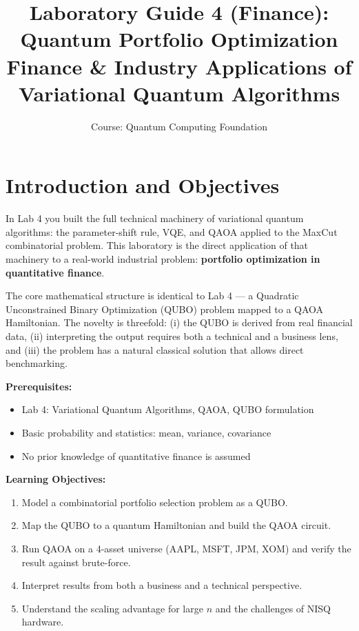 \documentclass[a4paper,11pt]{article}
\title{\textbf{Laboratory Guide 4 (Finance): Quantum Portfolio Optimization}\\
\large Finance \& Industry Applications of Variational Quantum Algorithms}
\author{Course: Quantum Computing Foundation}
\date{}
\begin{document}
\maketitle
\tableofcontents
\newpage

\section{Introduction and Objectives}

In Lab 4 you built the full technical machinery of variational quantum
algorithms: the parameter-shift rule, VQE, and QAOA applied to the MaxCut
combinatorial problem. This laboratory is the direct application of that
machinery to a real-world industrial problem: \textbf{portfolio optimization
in quantitative finance}.

The core mathematical structure is identical to Lab 4 — a Quadratic
Unconstrained Binary Optimization (QUBO) problem mapped to a QAOA Hamiltonian.
The novelty is threefold: (i) the QUBO is derived from real financial data,
(ii) interpreting the output requires both a technical and a business lens,
and (iii) the problem has a natural classical solution that allows direct
benchmarking.

\vspace{0.3cm}
\noindent\textbf{Prerequisites:}
\begin{itemize}
    \item Lab 4: Variational Quantum Algorithms, QAOA, QUBO formulation
    \item Basic probability and statistics: mean, variance, covariance
    \item No prior knowledge of quantitative finance is assumed
\end{itemize}

\noindent\textbf{Learning Objectives:}
\begin{enumerate}
    \item Model a combinatorial portfolio selection problem as a QUBO.
    \item Map the QUBO to a quantum Hamiltonian and build the QAOA circuit.
    \item Run QAOA on a 4-asset universe (AAPL, MSFT, JPM, XOM) and
          verify the result against brute-force.
    \item Interpret results from both a business and a technical perspective.
    \item Understand the scaling advantage for large $n$ and the challenges
          of NISQ hardware.
\end{enumerate}
\end{document}
